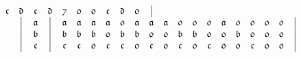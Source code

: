 \documentclass[final,12pt,a4paper,twoside,fleqn]{extbook}
\theoremstyle{definition}
\theoremstyle{remark}
\begin{document}
\begin{equation}
\begin{array}{@{}*{22}c@{}}
      {\mathfrak{c}} &%
      {\mathfrak{d}} &%
      {\mathfrak{c}} &%
      {\mathfrak{d}} &%
      {\mathfrak{7}} &%
      {\mathfrak{0}} &%
      {\mathfrak{0}} &%
      {\mathfrak{c}} &%
      {\mathfrak{d}} &%
      {\mathfrak{0}} &%
      \big\vert       %
      \\ \nonumber
      {}             &%
      \big\vert      &%
      {\mathfrak{a}} &%
      \big\vert      &%
      {\mathfrak{a}} &%
      {\mathfrak{a}} &%
      {\mathfrak{a}} &%
      {\mathfrak{a}} &%
      {\mathfrak{0}} &%
      {\mathfrak{a}} &%
      {\mathfrak{a}} &%
      {\mathfrak{a}} &%
      {\mathfrak{0}} &%
      {\mathfrak{0}} &%
      {\mathfrak{0}} &%
      {\mathfrak{a}} &%
      {\mathfrak{0}} &%
      {\mathfrak{0}} &%
      {\mathfrak{0}} &%
      {\mathfrak{0}} &%
      \big\vert       %
      \\ \nonumber
      {}             &%
      \big\vert      &%
      {\mathfrak{b}} &%
      \big\vert      &%
      {\mathfrak{b}} &%
      {\mathfrak{b}} &%
      {\mathfrak{b}} &%
      {\mathfrak{0}} &%
      {\mathfrak{b}} &%
      {\mathfrak{b}} &%
      {\mathfrak{0}} &%
      {\mathfrak{0}} &%
      {\mathfrak{b}} &%
      {\mathfrak{b}} &%
      {\mathfrak{0}} &%
      {\mathfrak{0}} &%
      {\mathfrak{b}} &%
      {\mathfrak{0}} &%
      {\mathfrak{0}} &%
      {\mathfrak{0}} &%
      \big\vert       %
      \\ \nonumber
      {}             &%
      \big\vert      &%
      {\mathfrak{c}} &%
      \big\vert      &%
      {\mathfrak{c}} &%
      {\mathfrak{c}} &%
      {\mathfrak{0}} &%
      {\mathfrak{c}} &%
      {\mathfrak{c}} &%
      {\mathfrak{0}} &%
      {\mathfrak{c}} &%
      {\mathfrak{0}} &%
      {\mathfrak{c}} &%
      {\mathfrak{0}} &%
      {\mathfrak{c}} &%
      {\mathfrak{0}} &%
      {\mathfrak{0}} &%
      {\mathfrak{c}} &%
      {\mathfrak{0}} &%
      {\mathfrak{0}} &%
      \big\vert       %
      \\ \nonumber

\end{array}
\end{equation}
\end{document}
